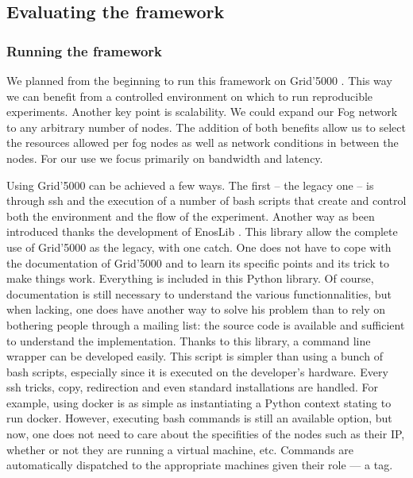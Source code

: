 \documentclass[11pt]{sdm}
\begin{document}
\subsection{Evaluating the framework}

\subsubsection{Running the framework}

We planned from the beginning to run this framework on Grid'5000 . This way we can benefit from a controlled environment on which to run reproducible experiments.  Another key point is scalability. We could expand our Fog network to any arbitrary number of nodes. The addition of both benefits allow us to select the resources allowed per fog nodes as well as network conditions in between the nodes. For our use we focus primarily on bandwidth and latency.


Using Grid'5000 can be achieved a few ways. The first – the legacy one – is through ssh and the execution of a number of bash scripts that create and control both the environment and the flow of the experiment.
Another way as been introduced thanks the development of EnosLib \cite{cherrueau_enoslib_2022}. This library allow the complete use of Grid'5000 as the legacy, with one catch. One does not have to cope with the documentation of Grid'5000 and to learn its specific points and its trick to make things work. Everything is included in this Python library. Of course, documentation is still necessary to understand the various functionnalities, but when lacking, one does have another way to solve his problem than to rely on bothering people through a mailing list: the source code is available and sufficient to understand the implementation. 
Thanks to this library, a command line wrapper can be developed easily. This script is simpler than using a bunch of bash scripts, especially since it is executed on the developer's hardware. Every ssh tricks, copy, redirection and even standard installations are handled. For example, using docker is as simple as instantiating a Python context stating to run docker.
However, executing bash commands is still an available option, but now, one does not need to care about the specifities of the nodes such as their IP, whether or not they are running a virtual machine, etc. Commands are automatically dispatched to the appropriate machines given their role — a tag.
\end{document}
